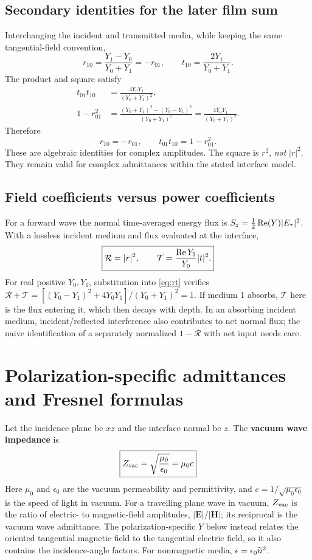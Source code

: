 \subsection{Secondary identities for the later film sum}
Interchanging the incident and transmitted media, while keeping the same tangential-field convention,
\begin{equation}
r_{10}=\frac{Y_1-Y_0}{Y_0+Y_1}=-r_{01},\qquad
 t_{10}=\frac{2Y_1}{Y_0+Y_1}.
\end{equation}
The product and square satisfy
\begin{align}
t_{01}t_{10}&=\frac{4Y_0Y_1}{(Y_0+Y_1)^2},\\
1-r_{01}^2&=\frac{(Y_0+Y_1)^2-(Y_0-Y_1)^2}{(Y_0+Y_1)^2}
=\frac{4Y_0Y_1}{(Y_0+Y_1)^2}.
\end{align}
Therefore
\begin{equation}
\boxed{r_{10}=-r_{01},\qquad t_{01}t_{10}=1-r_{01}^2.}
\label{eq:identities}
\end{equation}
These are algebraic identities for complex amplitudes. The square is $r^2$, \emph{not} $|r|^2$. They remain valid for complex admittances within the stated interface model.

\subsection{Field coefficients versus power coefficients}
For a forward wave the normal time-averaged energy flux is
$S_z=\tfrac12\operatorname{Re}(Y)|E_\tau|^2$. With a lossless incident medium and flux evaluated at the interface,
\begin{equation}
\boxed{\mathcal R=|r|^2,\qquad
\mathcal T=\frac{\operatorname{Re} Y_1}{Y_0}|t|^2.}
\end{equation}
For real positive $Y_0,Y_1$, substitution into \eqref{eq:rt} verifies
$\mathcal R+\mathcal T=[(Y_0-Y_1)^2+4Y_0Y_1]/(Y_0+Y_1)^2=1$.
If medium 1 absorbs, $\mathcal T$ here is the flux entering it, which then decays with depth. In an absorbing incident medium, incident/reflected interference also contributes to net normal flux; the naive identification of a separately normalized $1-\mathcal R$ with net input needs care.

\section{Polarization-specific admittances and Fresnel formulas}
Let the incidence plane be $xz$ and the interface normal be $z$.
The \textbf{vacuum wave impedance} is
\begin{equation}
\boxed{Z_{\rm vac}=\sqrt{\frac{\mu_0}{\epsilon_0}}=\mu_0c}
\end{equation}
Here $\mu_0$ and $\epsilon_0$ are the vacuum permeability and permittivity, and $c=1/\sqrt{\mu_0\epsilon_0}$ is the speed of light in vacuum. For a travelling plane wave in vacuum, $Z_{\rm vac}$ is the ratio of electric- to magnetic-field amplitudes, $|\mathbf E|/|\mathbf H|$; its reciprocal is the vacuum wave admittance. The polarization-specific $Y$ below instead relates the oriented tangential magnetic field to the tangential electric field, so it also contains the incidence-angle factors.
For nonmagnetic media, $\epsilon=\epsilon_0\widetilde n^2$.


